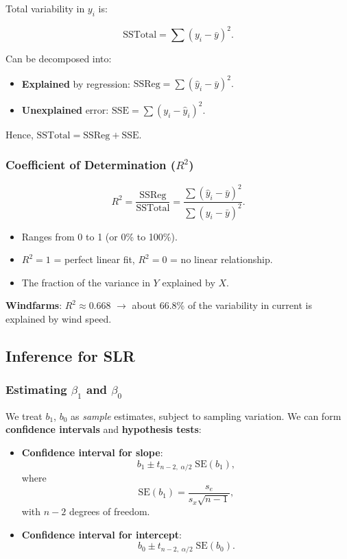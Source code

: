 \documentclass[10pt, total={6in, 8in}]{extarticle}
\begin{document}
Total variability in $y_i$ is:

\[
    \text{SSTotal} = \sum (y_i - \bar{y})^2.
\]

Can be decomposed into:
\begin{itemize}
    \item \textbf{Explained} by regression: $\text{SSReg} = \sum (\hat{y}_i - \bar{y})^2.$
    \item \textbf{Unexplained} error: $\text{SSE} = \sum (y_i - \hat{y}_i)^2.$
\end{itemize}

Hence, $\text{SSTotal} = \text{SSReg} + \text{SSE}.$

\subsubsection{Coefficient of Determination ($R^2$)}

\[
    R^2 = \frac{\text{SSReg}}{\text{SSTotal}} = \frac{\sum (\hat{y}_i - \bar{y})^2}{\sum (y_i - \bar{y})^2}.
\]

\begin{itemize}
    \item Ranges from 0 to 1 (or 0\% to 100\%).
    \item $R^2=1$ = perfect linear fit, $R^2=0$ = no linear relationship.
    \item The fraction of the variance in $Y$ explained by $X$.
\end{itemize}

\textbf{Windfarms}: $R^2 \approx 0.668$ $\rightarrow$ about 66.8\% of the variability in current is explained by wind speed.



\subsection{Inference for SLR}

\subsubsection{Estimating $\beta_1$ and $\beta_0$}

We treat $b_1$, $b_0$ as \emph{sample} estimates, subject to sampling variation. We can form \textbf{confidence intervals} and \textbf{hypothesis tests}:
\begin{itemize}
    \item \textbf{Confidence interval for slope}:
          \[
              b_1 \pm t_{n-2,\;\alpha/2}\; \text{SE}(b_1),
          \]
          where
          \[
              \text{SE}(b_1) = \frac{s_e}{s_x\sqrt{n-1}},
          \]
          with $n-2$ degrees of freedom.
    \item \textbf{Confidence interval for intercept}:
          \[
              b_0 \pm t_{n-2,\;\alpha/2}\; \text{SE}(b_0).
          \]
\end{itemize}
\end{document}
